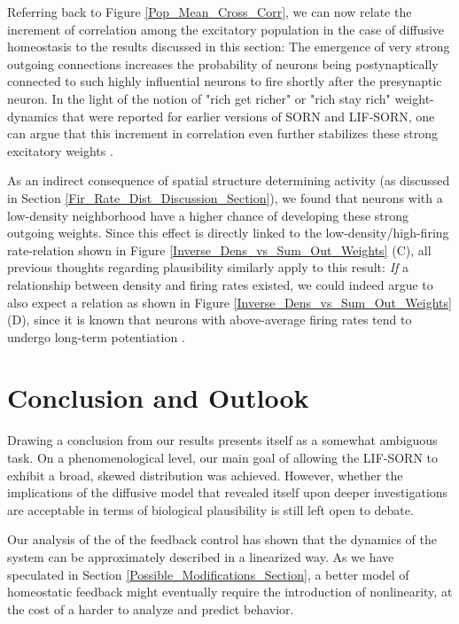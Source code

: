 \documentclass[10pt,a4paper]{article}
\begin{document}
Referring back to Figure \ref{Pop_Mean_Cross_Corr}, we can now relate the increment of correlation among the excitatory population in the case of diffusive homeostasis to the results discussed in this section: The emergence of very strong outgoing connections increases the probability of neurons being postynaptically connected to such highly influential neurons to fire shortly after the presynaptic neuron. In the light of the notion of "rich get richer" or "rich stay rich" weight-dynamics that were reported for earlier versions of SORN and LIF-SORN, one can argue that this increment in correlation even further stabilizes these strong excitatory weights \cite{Pengsheng_2013,SORN_Paper}.

As an indirect consequence of spatial structure determining activity (as discussed in Section \ref{Fir_Rate_Dist_Discussion_Section}), we found that neurons with a low-density neighborhood have a higher chance of developing these strong outgoing weights. Since this effect is directly linked to the low-density/high-firing rate-relation shown in Figure \ref{Inverse_Dens_vs_Sum_Out_Weights} (C), all previous thoughts regarding plausibility similarly apply to this result: \emph{If} a relationship between density and firing rates existed, we could indeed argue to also expect a relation as shown in Figure \ref{Inverse_Dens_vs_Sum_Out_Weights} (D), since it is known that neurons with above-average firing rates tend to undergo long-term potentiation \cite{Sjoestroem_Syn_Plasticity_2001,Feldman_STDP_2012}.

\newpage
\section{Conclusion and Outlook}\label{Conclusion_Section}
Drawing a conclusion from our results presents itself as a somewhat ambiguous task. On a phenomenological level, our main goal of allowing the LIF-SORN to exhibit a broad, skewed distribution was achieved. However, whether the implications of the diffusive model that revealed itself upon deeper investigations are acceptable in terms of biological plausibility is still left open to debate.

Our analysis of the of the feedback control has shown that the dynamics of the system can be approximately described in a linearized way. As we have speculated in Section \ref{Possible_Modifications_Section}, a better model of homeostatic feedback might eventually require the introduction of nonlinearity, at the cost of a harder to analyze and predict behavior. 
\end{document}

